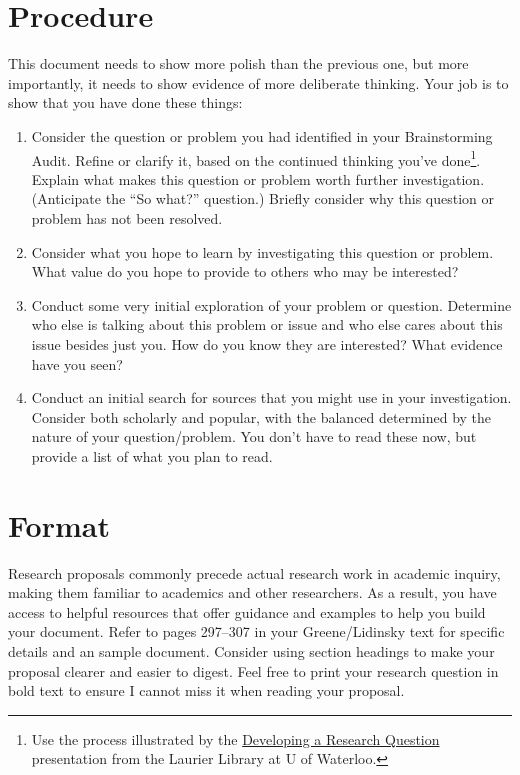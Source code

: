 \documentclass[11pt]{amsart}	%
\begin{document}
\section{Procedure} %
\label{sec:procedure}
This document needs to show more polish than the previous one, but more importantly, it needs to show evidence of more deliberate thinking. Your job is to show that you have done these things:
\begin{enumerate}
	\item Consider the question or problem you had identified in your Brainstorming Audit. Refine or clarify it, based on the continued thinking you've done\footnote{Use the process illustrated by the \href{http://library.wlu.ca/tutorials/research_question}{Developing a Research Question} presentation from the Laurier Library at U of Waterloo.}. Explain what makes this question or problem worth further investigation. (Anticipate the ``So what?'' question.) Briefly consider why this question or problem has not been resolved.
	\item Consider what you hope to learn by investigating this question or problem. What value do you hope to provide to others who may be interested? 
	\item Conduct some very initial exploration of your problem or question. Determine who else is talking about this problem or issue and who else cares about this issue besides just you. How do you know they are interested? What evidence have you seen?
	\item Conduct an initial search for sources that you might use in your investigation. Consider both scholarly and popular, with the balanced determined by the nature of your question/problem. You don’t have to read these now, but provide a list of what you plan to read.
\end{enumerate}

\section{Format} %
\label{sec:format}
Research proposals commonly precede actual research work in academic inquiry, making them familiar to academics and other researchers. As a result, you have access to helpful resources that offer guidance and examples to help you build your document. Refer to pages 297--307 in your Greene/Lidinsky text for specific details and an sample document. Consider using section headings to make your proposal clearer and easier to digest. Feel free to print your research question in bold text to ensure I cannot miss it when reading your proposal.
\end{document}
